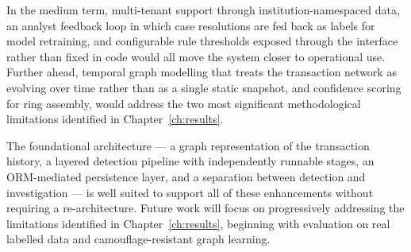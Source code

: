 In the medium term, multi-tenant support through institution-namespaced data, an analyst feedback loop in which case resolutions are fed back as labels for model retraining, and configurable rule thresholds exposed through the interface rather than fixed in code would all move the system closer to operational use. Further ahead, temporal graph modelling that treats the transaction network as evolving over time rather than as a single static snapshot, and confidence scoring for ring assembly, would address the two most significant methodological limitations identified in Chapter~\ref{ch:results}.

The foundational architecture --- a graph representation of the transaction history, a layered detection pipeline with independently runnable stages, an ORM-mediated persistence layer, and a separation between detection and investigation --- is well suited to support all of these enhancements without requiring a re-architecture. Future work will focus on progressively addressing the limitations identified in Chapter~\ref{ch:results}, beginning with evaluation on real labelled data and camouflage-resistant graph learning.
